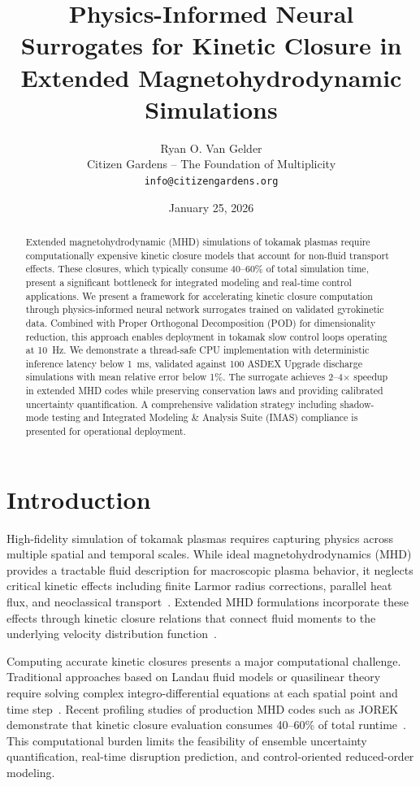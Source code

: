 \documentclass[12pt]{article}
\title{Physics-Informed Neural Surrogates for Kinetic Closure in Extended Magnetohydrodynamic Simulations}
\author{Ryan O. Van Gelder\\
\small Citizen Gardens -- The Foundation of Multiplicity\\
\small \texttt{info@citizengardens.org}}
\date{January 25, 2026}
\begin{document}
\maketitle

\begin{abstract}
Extended magnetohydrodynamic (MHD) simulations of tokamak plasmas require computationally expensive kinetic closure models that account for non-fluid transport effects. These closures, which typically consume 40--60\% of total simulation time, present a significant bottleneck for integrated modeling and real-time control applications. We present a framework for accelerating kinetic closure computation through physics-informed neural network surrogates trained on validated gyrokinetic data. Combined with Proper Orthogonal Decomposition (POD) for dimensionality reduction, this approach enables deployment in tokamak slow control loops operating at \SI{10}{\hertz}. We demonstrate a thread-safe CPU implementation with deterministic inference latency below \SI{1}{\milli\second}, validated against \num{100} ASDEX Upgrade discharge simulations with mean relative error below 1\%. The surrogate achieves 2--4$\times$ speedup in extended MHD codes while preserving conservation laws and providing calibrated uncertainty quantification. A comprehensive validation strategy including shadow-mode testing and Integrated Modeling \& Analysis Suite (IMAS) compliance is presented for operational deployment.
\end{abstract}

\section{Introduction}

High-fidelity simulation of tokamak plasmas requires capturing physics across multiple spatial and temporal scales. While ideal magnetohydrodynamics (MHD) provides a tractable fluid description for macroscopic plasma behavior, it neglects critical kinetic effects including finite Larmor radius corrections, parallel heat flux, and neoclassical transport~\cite{freidberg2014,huysmans2007}. Extended MHD formulations incorporate these effects through kinetic closure relations that connect fluid moments to the underlying velocity distribution function~\cite{braginskii1965,hazeltine2003}.

Computing accurate kinetic closures presents a major computational challenge. Traditional approaches based on Landau fluid models or quasilinear theory require solving complex integro-differential equations at each spatial point and time step~\cite{snyder2009,hammett1990}. Recent profiling studies of production MHD codes such as JOREK demonstrate that kinetic closure evaluation consumes 40--60\% of total runtime~\cite{feher2018}. This computational burden limits the feasibility of ensemble uncertainty quantification, real-time disruption prediction, and control-oriented reduced-order modeling.
\end{document}
